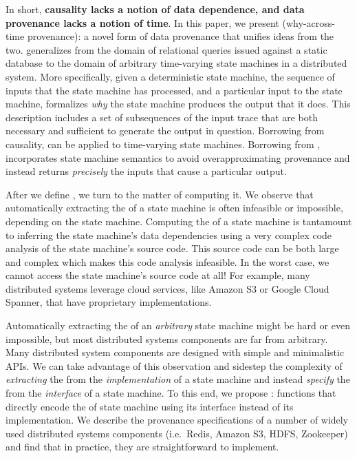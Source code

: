 In short, \textbf{causality lacks a notion of data dependence, and data
provenance lacks a notion of time}. In this paper, we present
 (why-across-time provenance): a novel form of data
provenance that unifies ideas from the two. \Watprovenance{} generalizes
\whyprovenance{} from the domain of relational queries issued against a static
database to the domain of arbitrary time-varying state machines in a
distributed system. More specifically, given a deterministic state machine, the
sequence of inputs that the state machine has processed, and a particular input
to the state machine, \watprovenance{} formalizes \emph{why} the state machine
produces the output that it does. This description includes a set of
subsequences of the input trace that are both necessary and sufficient to
generate the output in question.  Borrowing from causality, \watprovenance{}
can be applied to time-varying state machines. Borrowing from \whyprovenance{},
\watprovenance{} incorporates state machine semantics to avoid
overapproximating provenance and instead returns \emph{precisely} the inputs
that cause a particular output.

After we define \watprovenance{}, we turn to the matter of computing it. We
observe that automatically extracting the \watprovenance{} of a state machine
is often infeasible or impossible, depending on the state machine.  Computing
the \watprovenance{} of a state machine is tantamount to inferring the state
machine's data dependencies using a very complex code analysis of the state
machine's source code. This source code can be both large and complex which
makes this code analysis infeasible. In the worst case, we cannot access the
state machine's source code at all! For example, many distributed systems
leverage cloud services, like Amazon S3 or Google Cloud Spanner, that have
proprietary implementations.

Automatically extracting the \watprovenance{} of an \emph{arbitrary} state
machine might be hard or even impossible, but most distributed systems
components are far from arbitrary. Many distributed system components are
designed with simple and minimalistic APIs. We can take advantage of this
observation and sidestep the complexity of \emph{extracting} the
\watprovenance{} from the \emph{implementation} of a state machine and instead
\emph{specify} the \watprovenance{} from the \emph{interface} of a state
machine. To this end, we propose :
functions that directly encode the \watprovenance{} of state machine using its
interface instead of its implementation.  We describe the provenance
specifications of a number of widely used distributed systems components (i.e.\
Redis, Amazon S3, HDFS, Zookeeper) and find that in practice, they are
straightforward to implement.

